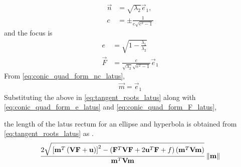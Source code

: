 \documentclass[journal,12pt,twocolumn]{IEEEtran}
\renewcommand\thesection{\arabic{section}}
\renewcommand\thesubsection{\thesection.\arabic{subsection}}
\begin{document}
\begin{enumerate}[label=\thesubsection.\arabic*.,ref=\thesubsection.\theenumi]
\begin{enumerate}
\begin{align}
\label{eq:conic_quad_form_nc_latus} 
  \vec{n}&= \sqrt{\lambda_2}\vec{e}_1,  
  \\
	c &=	\pm   \frac{ 1 }{e\sqrt{e^2-1} }
\end{align}  
and the focus is 
\begin{align}
  \label{eq:conic_quad_form_e_latus} 
  e&= \sqrt{1-\frac{\lambda_1}{\lambda_2}}
  \\
  \label{eq:conic_quad_form_F_latus} 
	\vec{F}  &= \frac{ e  }{\sqrt{\lambda_2}\sqrt{e^2-1}}\vec{e}_1
\end{align}  
From \eqref{eq:conic_quad_form_nc_latus},  
\begin{align}  
	\vec{m} = \vec{e}_1
\end{align}  
Substituting the above in 
\eqref{eq:tangent_roots_latus} along with
  \eqref{eq:conic_quad_form_e_latus} and  
  \eqref{eq:conic_quad_form_F_latus}, 


	the length of the latus rectum for an ellipse and hyperbola is obtained from 
\eqref{eq:tangent_roots_latus} as .
	{\tiny
\begin{multline}
 \frac{2\sqrt{
{}\left[
\mathbf{m}^T\left(\mathbf{V}\mathbf{F}+\mathbf{u}\right)
\right]^2
-
\left(
\mathbf{F}^T\mathbf{V}\mathbf{F} + 2\mathbf{u}^T\mathbf{F} +f
\right)
\left(\mathbf{m}^T\mathbf{V}\mathbf{m}\right)
}
}
{
\mathbf{m}^T\mathbf{V}\mathbf{m}
}\left\lVert\mathbf{m}\right\rVert
\label{eq:tangent_roots_latus}
\end{multline}
}


\end{enumerate}
\end{enumerate}
\end{document}
